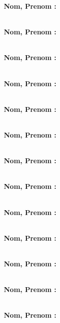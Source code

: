 \documentclass[10pt]{article}
\begin{document}
\begin{multicols}{3}

\textbf{Nom, Prenom : }\\
\fbox\\\vspace{1cm} 

\textbf{Nom, Prenom : }\\
\fbox\\\vspace{1cm}

\textbf{Nom, Prenom : }\\
\fbox\\ \vspace{1cm}

\textbf{Nom, Prenom : }\\
\fbox\\\vspace{1cm}

\textbf{Nom, Prenom : }\\
\fbox\\ \vspace{1cm}

\textbf{Nom, Prenom : }\\
\fbox\\ \vspace{1cm}

\textbf{Nom, Prenom : }\\
\fbox\\\vspace{1cm}

\textbf{Nom, Prenom : }\\
\fbox\\ \vspace{1cm}

\textbf{Nom, Prenom : }\\
\fbox\\\vspace{1cm}

\textbf{Nom, Prenom : }\\
\fbox\\\vspace{1cm}

\textbf{Nom, Prenom : }\\
\fbox\\ \vspace{1cm}

\textbf{Nom, Prenom : }\\
\fbox\\\vspace{1cm}

\textbf{Nom, Prenom : }\\
\fbox\\ \vspace{1cm}


\end{multicols}
\end{document}
